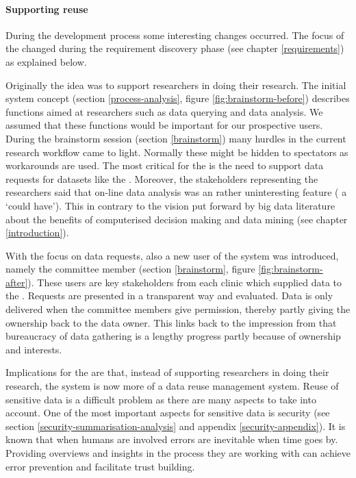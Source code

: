 \paragraph{Supporting reuse}

During the development process some interesting changes occurred.
The focus of the \ivfsystem{} changed during the requirement discovery phase (see chapter \ref{requirements}) as explained below.

Originally the idea was to support researchers in doing their research.
The initial system concept (section \ref{process-analysis}, figure \ref{fig:brainstorm-before}) describes functions aimed at researchers such as data querying and data analysis.
We assumed that these functions would be important for our prospective users.
During the brainstorm session (section \ref{brainstorm}) many hurdles in the current research workflow came to light.
Normally these might be hidden to spectators as workarounds are used.
The most critical for the \ivfsystem{} is the need to support data requests for datasets like the \projectdata{}.
Moreover, the stakeholders representing the researchers said that on-line data analysis was an rather uninteresting feature (\ie{} a `could have').
This in contrary to the vision put forward by big data literature about the benefits of computerised decision making and data mining (see chapter \ref{introduction}).

With the focus on data requests, also a new user of the system was introduced, namely the committee member (section \ref{brainstorm}, figure \ref{fig:brainstorm-after}).
These users are key stakeholders from each clinic which supplied data to the \projectdata{}.
Requests are presented in a transparent way and evaluated.
Data is only delivered when the committee members give permission,
thereby partly giving the ownership back to the data owner.
This links back to the impression from that bureaucracy of data gathering is a lengthy progress partly because of ownership and interests.

Implications for the \ivfsystem{} are that, instead of supporting researchers in doing their research, the system is now more of a data reuse management system.
Reuse of sensitive data is a difficult problem as there are many aspects to take into account.
One of the most important aspects for sensitive data is security (see section \ref{security-summarisation-analysis} and appendix \ref{security-appendix}).
It is known that when humans are involved errors are inevitable when time goes by.
Providing overviews and insights in the process they are working with can achieve error prevention and facilitate trust building.

